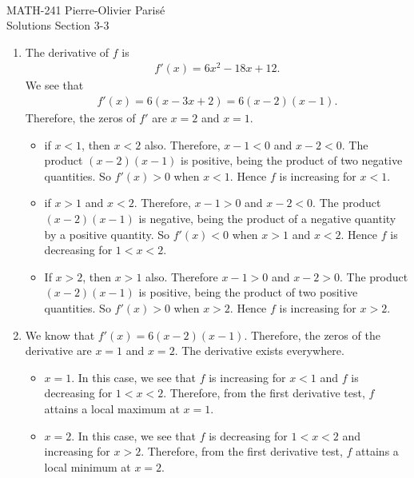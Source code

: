 


	\noindent \hrulefill \\
	MATH-241 \hfill Pierre-Olivier Paris{\'e}\\
	Solutions Section 3-3 \hfill \semester \\\vspace*{-1cm}
	
	\noindent\hrulefill
	
	\spc
		
	\begin{enumerate}[label=\alph*)]
	\item The derivative of $f$ is 
		\begin{align*}
		f'(x) = 6x^2 - 18x + 12 .
		\end{align*}
	We see that 	
		\begin{align*}
		f'(x) = 6 (x - 3x + 2) = 6(x - 2) (x - 1) .
		\end{align*}
	Therefore, the zeros of $f'$ are $x = 2$ and $x = 1$. 
		\begin{itemize}
		\item if $x < 1$, then $x < 2$ also. Therefore, $x - 1 < 0$ and $x - 2 < 0$. The product $(x - 2) (x - 1)$ is positive, being the product of two negative quantities. So $f' (x ) > 0$ when $x < 1$. Hence $f$ is increasing for $x < 1$.
		\item if $x > 1$ and $x < 2$. Therefore, $x - 1 > 0$ and $x - 2 < 0$. The product $(x - 2) (x - 1)$ is negative, being the product of a negative quantity by a positive quantity. So $f'(x) < 0$ when $x > 1$ and $x < 2$. Hence $f$ is decreasing for $1 < x < 2$. 
		\item If $x > 2$, then $x > 1$ also. Therefore $x - 1 > 0$ and $x - 2 > 0$. The product $(x - 2) (x - 1)$ is positive, being the product of two positive quantities. So $f'(x) > 0$ when $x > 2$. Hence $f$ is increasing for $x > 2$. 
		\end{itemize}
	\item We know that $f'(x) = 6(x - 2) (x - 1)$. Therefore, the zeros of the derivative are $x = 1$ and $x = 2$. The derivative exists everywhere. 
		\begin{itemize}
		\item $x = 1$. In this case, we see that $f$ is increasing for $x < 1$ and $f$ is decreasing for $1 < x < 2$. Therefore, from the first derivative test, $f$ attains a local maximum at $x = 1$.
		\item $x = 2$. In this case, we see that $f$ is decreasing for $1 < x < 2$ and increasing for $x > 2$. Therefore, from the first derivative test, $f$ attains a local minimum at $x = 2$. 

\end{itemize}
\end{enumerate}

